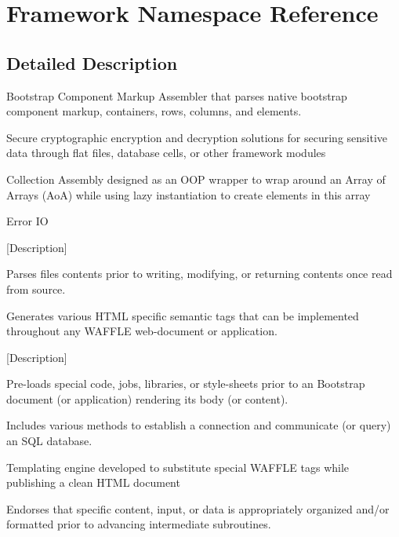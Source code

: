 \hypertarget{namespace_framework}{}\section{Framework Namespace Reference}
\label{namespace_framework}


\subsection{Detailed Description}
Bootstrap Component Markup Assembler that parses native bootstrap component markup, containers, rows, columns, and elements.

Secure cryptographic encryption and decryption solutions for securing sensitive data through flat files, database cells, or other framework modules

Collection Assembly designed as an O\+OP wrapper to wrap around an Array of Arrays (AoA) while using lazy instantiation to create elements in this array

Error IO

\mbox{[}Description\mbox{]}

Parses files contents prior to writing, modifying, or returning contents once read from source.

Generates various H\+T\+ML specific semantic tags that can be implemented throughout any W\+A\+F\+F\+LE web-\/document or application.

\mbox{[}Description\mbox{]}

Pre-\/loads special code, jobs, libraries, or style-\/sheets prior to an Bootstrap document (or application) rendering its body (or content).

Includes various methods to establish a connection and communicate (or query) an S\+QL database.

Templating engine developed to substitute special W\+A\+F\+F\+LE tags while publishing a clean H\+T\+ML document

Endorses that specific content, input, or data is appropriately organized and/or formatted prior to advancing intermediate subroutines.